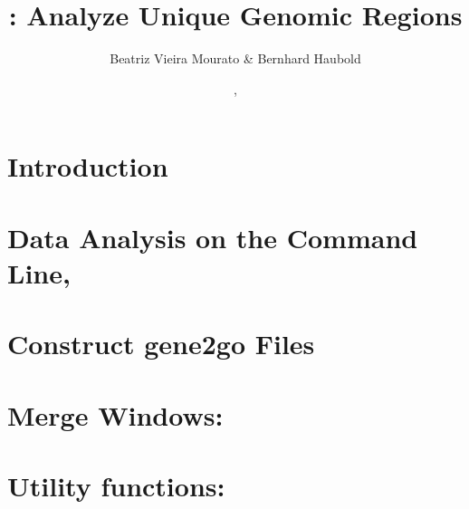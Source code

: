 \documentclass[a4paper]{report}
\begin{document}
\pagestyle{noweb}

\title{: Analyze Unique Genomic Regions}
\author{Beatriz Vieira Mourato \& Bernhard Haubold}
\date{\!\!, }
\maketitle

\tableofcontents

\chapter{Introduction}

\chapter{Data Analysis on the Command Line, }\label{ch:cli}

\chapter{Construct gene2go Files}\label{ch:g2g}

\chapter{Merge Windows: }\label{ch:me}

\chapter{Utility functions: }\label{ch:uti}



\end{document}
